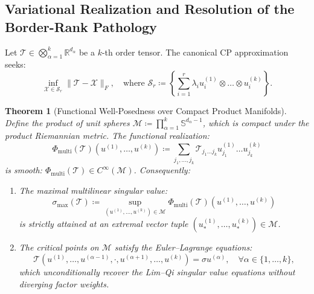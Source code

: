 \documentclass[11pt,a4paper,reqno]{amsart}
\newtheorem{theorem}{Theorem}[section]
\theoremstyle{definition}
\numberwithin{equation}{section}
\newcommand{\R}{\mathbb{R}}
\newcommand{\Sph}{\mathbb{S}}
\begin{document}
\subsection{Variational Realization and Resolution of the Border-Rank Pathology}
\label{subsec:tensors_border_rank}

Let $\mathcal{T} \in \bigotimes_{\alpha=1}^k \R^{d_\alpha}$ be a $k$-th order tensor. The canonical CP approximation seeks:
\begin{equation}
    \label{eq:cp_approx_problem}
    \inf_{\mathcal{X} \in \mathcal{S}_r} \|\mathcal{T} - \mathcal{X}\|_F, \quad \text{where } \mathcal{S}_r \coloneqq \left\{ \sum_{i=1}^r \lambda_i u_i^{(1)} \otimes \dots \otimes u_i^{(k)} \right\}.
\end{equation}

\begin{theorem}[Functional Well-Posedness over Compact Product Manifolds]
\label{thm:tensor_weierstrass}
Define the product of unit spheres $\mathcal{M} \coloneqq \prod_{\alpha=1}^k \Sph^{d_\alpha - 1}$, which is compact under the product Riemannian metric. The functional realization:
\begin{equation}
    \Phi_{\mathrm{multi}}(\mathcal{T})(u^{(1)}, \dots, u^{(k)}) \coloneqq \sum_{j_1, \dots, j_k} \mathcal{T}_{j_1 \dots j_k} u_{j_1}^{(1)} \dots u_{j_k}^{(k)}
\end{equation}
is smooth: $\Phi_{\mathrm{multi}}(\mathcal{T}) \in C^\infty(\mathcal{M})$. Consequently:
\begin{enumerate}[label=(\roman*)]
    \item The maximal multilinear singular value:
    \begin{equation}
        \sigma_{\max}(\mathcal{T}) \coloneqq \sup_{(u^{(1)}, \dots, u^{(k)}) \in \mathcal{M}} \Phi_{\mathrm{multi}}(\mathcal{T})(u^{(1)}, \dots, u^{(k)})
    \end{equation}
    is strictly attained at an extremal vector tuple $(u_*^{(1)}, \dots, u_*^{(k)}) \in \mathcal{M}$.
    \item The critical points on $\mathcal{M}$ satisfy the Euler--Lagrange equations:
    \begin{equation}
        \label{eq:tensor_critical}
        \mathcal{T}(u^{(1)}, \dots, u^{(\alpha-1)}, \cdot, u^{(\alpha+1)}, \dots, u^{(k)}) = \sigma u^{(\alpha)}, \quad \forall \alpha \in \{1, \dots, k\},
    \end{equation}
    which unconditionally recover the Lim--Qi singular value equations without diverging factor weights.
\end{enumerate}
\end{theorem}
\end{document}
